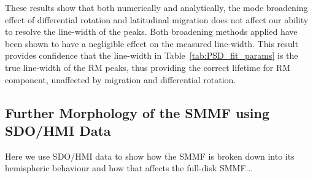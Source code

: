 These results show that both numerically and analytically, the mode broadening effect of differential rotation and latitudinal migration does not affect our ability to resolve the line-width of the peaks. Both broadening methods applied have been shown to have a negligible effect on the measured line-width. This result provides confidence that the line-width in Table~\ref{tab:PSD_fit_params} is the true line-width of the RM peaks, thus providing the correct lifetime for RM component, unaffected by migration and differential rotation.





\subsection{Further Morphology of the SMMF using SDO/HMI Data}
\label{sec:SMMF_morphology}

Here we use SDO/HMI data to show how the SMMF is broken down into its hemispheric behaviour and how that affects the full-disk SMMF...



